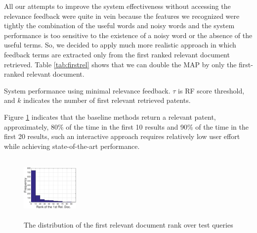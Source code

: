 All our attempts to improve the system effectiveness without accessing the relevance feedback were quite in vein because the features we recognized were tightly the combination of the useful words and noisy words and the system performance is too sensitive to the existence of a noisy word or the absence of the useful terms. So, we decided to apply much more realistic approach in which feedback terms are extracted only from the first ranked relevant document retrieved. Table \ref{tab:firstrel} shows that we can double the MAP by only the first-ranked relevant document.
\begin{table}[htpb]
  \begin{center}
   \caption{System performance using minimal relevance feedback. $\tau$ is RF score threshold, and $k$ indicates the number of first relevant retrieved patents.}\vspace{3mm}
     
  \label{tab:firstrel}
  \end{center}  
\end{table}
Figure \ref{fig:FirstTPRankHisto} indicates that the baseline methods return a relevant patent, approximately, 80\% of the time in the first 10 results and 90\% of the time in the first 20 results, such an interactive approach requires relatively low user effort while achieving state-of-the-art performance.    
\begin{figure}[htpb]
   \centering
   \includegraphics[width=0.25\textwidth,height=32mm]{figs/1stRank.eps}
   \caption{The distribution of the first relevant document rank over test queries}   
   \label{fig:FirstTPRankHisto} 
\end{figure}